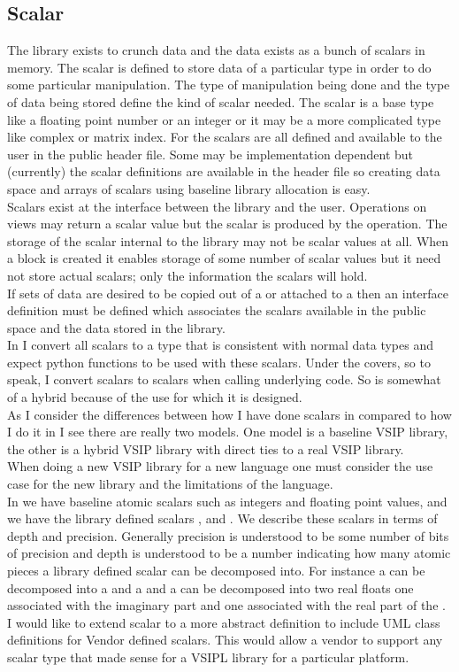 \subsection{Scalar}
The library exists to crunch data and the data exists as a bunch of scalars in memory. The scalar is defined to store data of a particular type in order to do some particular manipulation.  The type of manipulation being done and the type of data being stored define the kind of scalar needed. The scalar is a base type like a floating point number or an integer or it may be a more complicated type like complex or matrix index. For \cvl{} the scalars are all defined and available to the user in the public header file.  Some may be implementation dependent but (currently) the scalar definitions are available in the header file so creating data space and arrays of scalars using baseline library allocation is easy.
\\[6pt]
Scalars exist at the interface between the library and the user. Operations on views may return a scalar value but the scalar is produced by the operation.  The storage of the scalar internal to the library may not be scalar values at all.  When a block is created it enables storage of some number of scalar values but it need not store actual scalars; only the information the scalars will hold.
\\[6pt]
If sets of data are desired to be copied out of a \vw{} or attached to a \blk{} then an interface definition must be defined which associates the scalars available in the public space and the data stored in the library.
\\[6pt] 
In \pyjv{} I convert all scalars to a type that is consistent with normal  data types and expect python functions to be used with these scalars. Under the covers, so to speak, I convert \pyjv{} scalars to \cvl{} scalars when calling underlying \cvl{} code. So \pyjv{} is somewhat of a hybrid because of the use for which it is designed. 
\\[6pt]
As I consider the differences between how I have done scalars in \pyjv{} compared to how I do it in \cvl{} I see there are really two models.  One model is a baseline VSIP library, the other is a hybrid VSIP library with direct ties to a real VSIP library. 
\\[6pt]
When doing a new VSIP library for a new language one must consider the use case for the new library and the limitations of the language.
\\[6pt]
In \cvl{} we have baseline atomic scalars such as integers and floating point values, and we have the library defined scalars ,  and .  We describe these scalars in terms of depth and precision. Generally precision is understood to be some number of bits of precision and depth is understood to be a number indicating how many atomic pieces a library defined scalar can be decomposed into. For instance a  can be decomposed into a  and a  and a  can be decomposed into two real floats one associated with the imaginary part  and one associated with the real part of the .
\\[6pt]
I would like to extend scalar to a more abstract definition to include UML class definitions for Vendor defined scalars. This would allow a vendor to support any scalar type that made sense for a VSIPL library for a particular platform.
